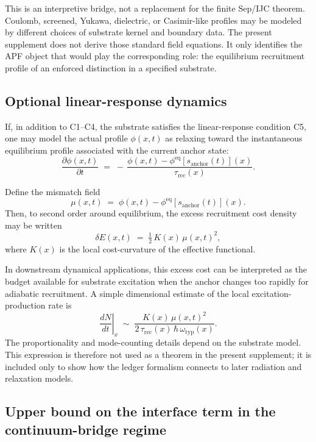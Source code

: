 \documentclass[11pt]{article}
\begin{document}
This is an interpretive bridge, not a replacement for the finite
Sep/IJC theorem.  Coulomb, screened, Yukawa, dielectric, or
Casimir-like profiles may be modeled by different choices of substrate
kernel and boundary data.  The present supplement does not derive those
standard field equations.  It only identifies the APF object that would
play the corresponding role: the equilibrium recruitment profile of an
enforced distinction in a specified substrate.

\subsection{Optional linear-response dynamics}\label{subsec:linear-response-dynamics}

If, in addition to C1--C4, the substrate satisfies the linear-response
condition C5, one may model the actual profile $\phi(x, t)$ as relaxing
toward the instantaneous equilibrium profile associated with the
current anchor state:
\begin{equation}\label{eq:relaxation}
\frac{\partial \phi(x, t)}{\partial t}
\;=\;
-\,\frac{\phi(x, t) - \phi^{\mathrm{eq}}[s_{\mathrm{anchor}}(t)](x)}
{\tau_{\mathrm{rec}}(x)}.
\end{equation}

Define the mismatch field
\[
    \mu(x, t)
    \;=\;
    \phi(x, t) - \phi^{\mathrm{eq}}[s_{\mathrm{anchor}}(t)](x).
\]
Then, to second order around equilibrium, the excess recruitment cost
density may be written
\[
    \delta E(x, t) \;=\; \tfrac{1}{2}\, K(x)\, \mu(x, t)^2,
\]
where $K(x)$ is the local cost-curvature of the effective functional.

In downstream dynamical applications, this excess cost can be
interpreted as the budget available for substrate excitation when the
anchor changes too rapidly for adiabatic recruitment.  A simple
dimensional estimate of the local excitation-production rate is
\[
    \left.\frac{dN}{dt}\right|_x
    \;\sim\;
    \frac{K(x)\, \mu(x, t)^2}
    {2\, \tau_{\mathrm{rec}}(x)\, \hbar\, \omega_{\mathrm{typ}}(x)}.
\]
The proportionality and mode-counting details depend on the substrate
model.  This expression is therefore not used as a theorem in the
present supplement; it is included only to show how the ledger
formalism connects to later radiation and relaxation models.

\subsection{Upper bound on the interface term in the continuum-bridge regime}\label{subsec:kappa-int-upper-bound}
\end{document}
